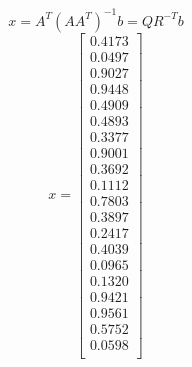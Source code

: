 \documentclass[12pt]{article}
\begin{document}
            \[
                x = A^T(AA^T)^{-1}b = QR^{-T}b 
            \]
            \[
                x = 
                \left[
                    \begin{array}{c}
                        0.4173\\
                        0.0497\\
                        0.9027\\
                        0.9448\\
                        0.4909\\
                        0.4893\\
                        0.3377\\
                        0.9001\\
                        0.3692\\
                        0.1112\\
                        0.7803\\
                        0.3897\\
                        0.2417\\
                        0.4039\\
                        0.0965\\
                        0.1320\\
                        0.9421\\
                        0.9561\\
                        0.5752\\
                        0.0598\\
                    \end{array}
                \right]
            \]
\end{document}
